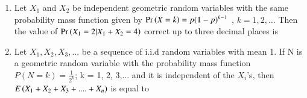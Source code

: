 \begin{enumerate}[label=\thesection.\arabic*.,ref=\thesection.\theenumi]
%
\item Let $X_1$ and $X_2$ be independent geometric random variables with the same probability
mass function given by $\Pr\left(X = k\right) = p(1-p)^{k-1}$
, $k = 1, 2, \ldots$ Then the value of
$\Pr\left(X_1 = 2 | X_1 + X_2 = 4\right)$ correct up to three decimal places is
\\
  \solution
  
%
\item Let $X_1, X_2, X_3,...$ be a sequence of i.i.d random variables with mean 1. If N is a geometric random variable with the probability mass function $P(N = k) = \frac{1}{2^k}$; k = 1, 2, 3,... and it is independent of the $X_i$'s, then $E\left(X_1 + X_2 + X_3 +....+ X_n\right)$ is equal to 
%
\\
\solution
  


\end{enumerate}